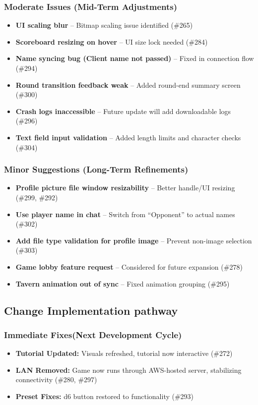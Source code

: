 \documentclass{article}
\begin{document}
\subsubsection{Moderate Issues (Mid-Term Adjustments)}
\begin{itemize}
    \item \textbf{UI scaling blur} – Bitmap scaling issue identified (\#265)
    \item \textbf{Scoreboard resizing on hover} – UI size lock needed (\#284)
    \item \textbf{Name syncing bug (Client name not passed)} – Fixed in connection flow (\#294)
    \item \textbf{Round transition feedback weak} – Added round-end summary screen (\#300)
    \item \textbf{Crash logs inaccessible} – Future update will add downloadable logs (\#296)
    \item \textbf{Text field input validation} – Added length limits and character checks (\#304)
\end{itemize}

\subsubsection{Minor Suggestions (Long-Term Refinements)}
\begin{itemize}
    \item \textbf{Profile picture file window resizability} – Better handle/UI resizing (\#299, \#292)
    \item \textbf{Use player name in chat} – Switch from “Opponent” to actual names (\#302)
    \item \textbf{Add file type validation for profile image} – Prevent non-image selection (\#303)
    \item \textbf{Game lobby feature request} – Considered for future expansion (\#278)
    \item \textbf{Tavern animation out of sync} – Fixed animation grouping (\#295)
\end{itemize}

\subsection{Change Implementation pathway}

\subsubsection{Immediate Fixes(Next Development Cycle)}
\begin{itemize}
    \item \textbf{Tutorial Updated:} Visuals refreshed, tutorial now interactive (\#272)
    \item \textbf{LAN Removed:} Game now runs through AWS-hosted server, stabilizing connectivity (\#280, \#297)
    \item \textbf{Preset Fixes:} d6 button restored to functionality (\#293)
\end{itemize}
\end{document}
